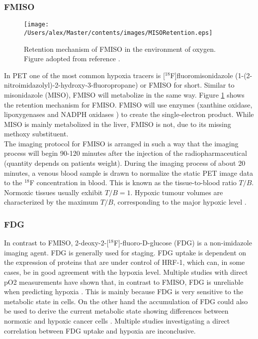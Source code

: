 \subsubsection{FMISO}
\begin{figure}[hb]
\centering
\texttt{[image: /Users/alex/Master/contents/images/MISORetention.eps]}
\vspace{1cm}
\caption{Retention mechanism of FMISO in the environment of oxygen. Figure adopted from reference \cite{pmid18523070}.}
\label{fig:MISORetention}
\end{figure}
In PET one of the most common hypoxia tracers is [$^{18}$F]fluoromisonidazole (1-(2-nitroimidazolyl)-2-hydroxy-3-fluoropropane) or FMISO for short. Similar to misonidazole (MISO), FMISO will metabolize in the same way. Figure \ref{fig:MISORetention} shows the retention mechanism for FMISO. FMISO will use enzymes (xanthine oxidase, lipoxygenases and NADPH oxidases \cite{pmid18523070}) to create the single-electron product. While MISO is mainly metabolized in the liver, FMISO is not, due to its missing methoxy substituent.\\The imaging protocol for FMISO is arranged in such a way that the imaging process will begin 90-120 minutes after the injection of the radiopharmaceutical (quantity depends on patients weight). During the imaging process of about 20 minutes, a venous blood sample is drawn to normalize the static PET image data to the $^{18}$F concentration in blood. This is known as the tissue-to-blood ratio $T/B$. Normoxic tissues usually exhibit $T/B = 1$. Hypoxic tumour volumes are characterized by the maximum $T/B$, corresponding to the major hypoxic level \cite{pmid18523070}.
\subsubsection{FDG}
In contrast to FMISO, 2-deoxy-2-[$^{18}$F]-fluoro-D-glucose (FDG) is a non-imidazole imaging agent. FDG is generally used for staging. FDG uptake is dependent on the expression of proteins that are under control of HRF-1, which can, in some cases, be in good agreement with the hypoxia level. Multiple studies with direct pO2 measurements have shown that, in contrast to FMISO, FDG is unreliable when predicting hypoxia \cite{pmid18682937}. This is mainly because FDG is very sensitive to the metabolic state in cells. On the other hand the accumulation of FDG could also be used to derive the current metabolic state showing differences between normoxic and hypoxic cancer cells \cite{pmid17400370}. Multiple studies investigating a direct correlation between FDG uptake and hypoxia are inconclusive.
